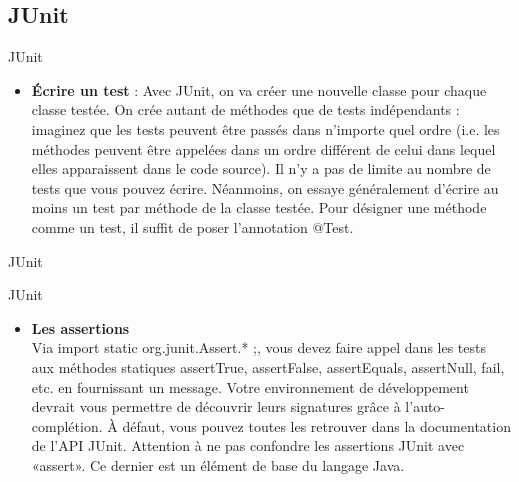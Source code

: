 \documentclass{beamer}
\begin{document}
\subsection{JUnit}

\begin{frame}{JUnit}
    \begin{itemize}
        \item{{\bfseries Écrire un test} : Avec JUnit, on va créer une nouvelle classe pour chaque classe testée. On crée autant de méthodes que de tests indépendants : imaginez que les tests peuvent être passés dans n'importe quel ordre (i.e. les méthodes peuvent être appelées dans un ordre différent de celui dans lequel elles apparaissent dans le code source). Il n'y a pas de limite au nombre de tests que vous pouvez écrire. Néanmoins, on essaye généralement d'écrire au moins un test par méthode de la classe testée. Pour désigner une méthode comme un test, il suffit de poser l'annotation {\color{blue}@Test}.}
        \end{itemize}   
\end{frame}
\begin{frame}{JUnit}
   
   \end{frame}
  \begin{frame}{JUnit}
   \begin{itemize}
       \item{{\bfseries Les assertions}
    \\Via {\color{blue}import static org.junit.Assert.* };, vous devez faire appel
    dans les tests aux méthodes statiques assertTrue, assertFalse,
    assertEquals, assertNull, fail, etc. en fournissant un message.
    Votre environnement de développement devrait vous permettre
    de découvrir leurs signatures grâce à l’auto-complétion. À
    défaut, vous pouvez toutes les retrouver dans la
    documentation de l’API JUnit.   
Attention à ne pas confondre les assertions JUnit avec
«assert». Ce dernier est un élément de base du langage
Java.}%
    \end{itemize}
   \end{frame}
       
\end{document}
